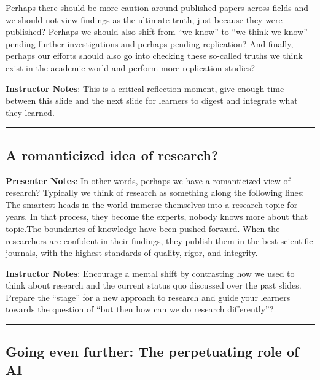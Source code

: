 \documentclass[
  english,
  letterpaper,
  DIV=11,
  numbers=noendperiod]{scrartcl}
\begin{document}
Perhaps there should be more caution around published papers across
fields and we should not view findings as the ultimate truth, just
because they were published? Perhaps we should also shift from ``we
know'' to ``we think we know'' pending further investigations and
perhaps pending replication? And finally, perhaps our efforts should
also go into checking these so-called truths we think exist in the
academic world and perform more replication studies?

\textbf{Instructor Notes}: This is a critical reflection moment, give
enough time between this slide and the next slide for learners to digest
and integrate what they learned.

\begin{center}\rule{0.5\linewidth}{0.5pt}\end{center}

\subsection{A romanticized idea of
research?}\label{a-romanticized-idea-of-research}

\textbf{Presenter Notes}: In other words, perhaps we have a romanticized
view of research? Typically we think of research as something along the
following lines: The smartest heads in the world immerse themselves into
a research topic for years. In that process, they become the experts,
nobody knows more about that topic.The boundaries of knowledge have been
pushed forward. When the researchers are confident in their findings,
they publish them in the best scientific journals, with the highest
standards of quality, rigor, and integrity.

\textbf{Instructor Notes}: Encourage a mental shift by contrasting how
we used to think about research and the current status quo discussed
over the past slides. Prepare the ``stage'' for a new approach to
research and guide your learners towards the question of ``but then how
can we do research differently''?

\begin{center}\rule{0.5\linewidth}{0.5pt}\end{center}

\subsection{Going even further: The perpetuating role of
AI}\label{going-even-further-the-perpetuating-role-of-ai}
\end{document}
